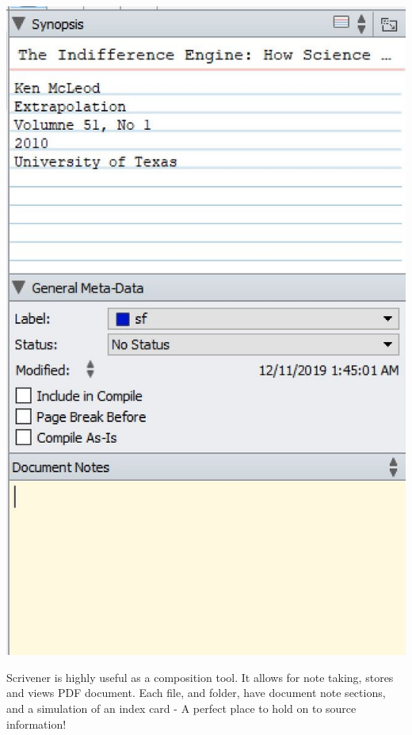 \documentclass[unknownkeysallowed,usepdftitle=false, aspectratio=169,parskip=full]{beamer}
\begin{document}
\begin{frame}
\begin{center}
\includegraphics[width=1\textwidth,height=0.5\textheight,keepaspectratio]{Images/OtherUsesScriv2.JPG}
\end{center}
    
    Scrivener is highly useful as a composition tool. It allows for note taking, stores and views PDF document. Each file, and folder, have document note sections, and a simulation of an index card - A perfect place to hold on to source information!
    
\end{frame}
\end{document}
